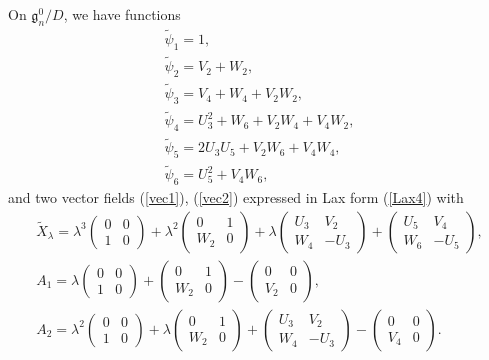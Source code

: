 \documentclass[10pt,a4paper]{amsart}
\numberwithin{equation}{section}
\begin{document}
On $\mathfrak{g}^0_n/D$, we have functions
\begin{gather*}
\widetilde{\psi}_1 = 1, \\
\widetilde{\psi}_2 = V_2+W_2, \\
\widetilde{\psi}_3 = V_4+W_4+V_2W_2, \\
\widetilde{\psi}_4 = U_3^2 + W_6 + V_2W_4 + V_4W_2, \\
\widetilde{\psi}_5 = 2U_3U_5 + V_2W_6 + V_4W_4, \\
\widetilde{\psi}_6 = U_5^2 + V_4W_6,
\end{gather*}
and two vector f\/ields (\ref{vec1}), (\ref{vec2}) expressed in Lax form (\ref{Lax4}) with
\begin{gather*}
\widetilde{X}_\lambda = \lambda ^3 \left(
\begin{matrix}
0 & 0 \\
1 & 0
\end{matrix}
\right) + \lambda^2 \left(
\begin{matrix}
0 & 1 \\
W_2 & 0
\end{matrix}
\right) + \lambda \left(
\begin{matrix}
U_3 & V_2 \\
W_4 & -U_3
\end{matrix}
\right) + \left(
\begin{matrix}
U_5 & V_4 \\
W_6 & -U_5
\end{matrix}
\right), \\
A_1 = \lambda \left(
\begin{matrix}
0 & 0 \\
1 & 0
\end{matrix}
\right) + \left(
\begin{matrix}
0 & 1 \\
W_2 & 0
\end{matrix}
\right) - \left(
\begin{matrix}
0 & 0 \\
V_2 & 0
\end{matrix}
\right), \\
A_2 = \lambda^2 \left(
\begin{matrix}
0 & 0 \\
1 & 0
\end{matrix}
\right) + \lambda \left(
\begin{matrix}
0 & 1 \\
W_2 & 0
\end{matrix}
\right) + \left(
\begin{matrix}
U_3 & V_2 \\
W_4 & -U_3
\end{matrix}
\right)
 - \left(
\begin{matrix}
0 & 0 \\
V_4 & 0
\end{matrix}
\right).
\end{gather*}
\end{document}
